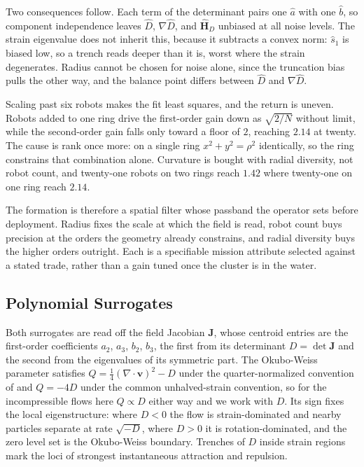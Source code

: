 \documentclass[lettersize,journal]{IEEEtran}
\begin{document}
Two consequences follow. Each term of the determinant pairs one
$\hat{a}$ with one $\hat{b}$, so component independence leaves
$\hat{D}$, $\nabla\hat{D}$, and $\hat{\mathbf{H}}_D$ unbiased at all
noise levels. The strain eigenvalue does not inherit this, because it
subtracts a convex norm: $\hat{s}_1$ is biased low, so a trench reads
deeper than it is, worst where the strain degenerates. Radius cannot
be chosen for noise alone, since the truncation bias pulls the other
way, and the balance point differs between $\hat{D}$ and
$\nabla\hat{D}$.

Scaling past six robots makes the fit least squares, and the return is
uneven. Robots added to one ring drive the first-order gain down as
$\sqrt{2/N}$ without limit, while the second-order gain falls only
toward a floor of $2$, reaching $2.14$ at twenty. The cause is rank once
more: on a single ring $x^2 + y^2 = \rho^2$ identically, so the ring
constrains that combination alone. Curvature is bought with radial
diversity, not robot count, and twenty-one robots on two rings
reach $1.42$ where twenty-one on one ring reach $2.14$.

The formation is therefore a spatial filter whose passband the operator
sets before deployment. Radius fixes the scale at which the field is
read, robot count buys precision at the orders the geometry already
constrains, and radial diversity buys the higher orders outright. Each
is a specifiable mission attribute selected against a stated trade,
rather than a gain tuned once the cluster is in the water.

\subsection{Polynomial Surrogates}
\label{sec:surrogates}
\label{sec:strain_field}

Both surrogates are read off the field Jacobian $\mathbf{J}$, whose
centroid entries are the first-order coefficients $a_2$, $a_3$, $b_2$,
$b_3$, the first from its determinant $D = \det \mathbf{J}$ and the
second from the eigenvalues of its symmetric part. The Okubo-Weiss
parameter \cite{21,22} satisfies $Q = \tfrac{1}{4} (\nabla \cdot
\mathbf{v})^2 - D$ under the quarter-normalized convention of
\cite{24} and $Q = -4D$ under the common unhalved-strain convention, so
for the incompressible flows here $Q \propto D$ either way and we work
with $D$. Its sign fixes the local eigenstructure: where $D < 0$ the
flow is strain-dominated and nearby particles separate at rate
$\sqrt{-D}$, where $D > 0$ it is rotation-dominated,
and the zero level set is the Okubo-Weiss boundary.
Trenches of $D$ inside strain regions mark the loci of strongest
instantaneous attraction and repulsion.
\end{document}
